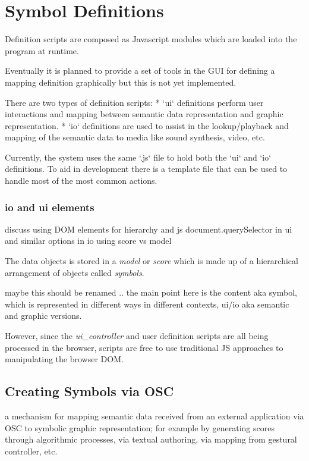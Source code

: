 \documentclass{article}
\begin{document}
\section{Symbol Definitions}\label{library_definitions_api}

Definition scripts are composed as Javascript modules which are loaded into the program at runtime.

Eventually it is planned to provide a set of tools in the GUI for defining a mapping definition graphically but this is not yet implemented.

There are two types of definition scripts:
* `ui` definitions perform user interactions and mapping between semantic data representation and graphic representation.
* `io` definitions are used to assist in the lookup/playback and mapping of the semantic data to media like sound synthesis, video, etc.

Currently, the system uses the same `.js` file to hold both the `ui` and `io` definitions. To aid in development there is a template file that can be used to handle most of the most common actions.


\subsubsection*{io and ui elements}\label{subsec:io_ui_elements}

discuss using DOM elements for hierarchy and js document.querySelector in ui
and similar options in io using score vs model


The data objects is stored in a \textit{model} or \textit{score} which is made up of a hierarchical arrangement of objects called \textit{symbols}.


maybe this should be renamed ..
the main point here is the content aka symbol, which is represented in different ways in different contexts, ui/io aka semantic and graphic versions.

However, since the \textit{ui\_controller} and user definition scripts are all being processed in the browser, scripts are free to use traditional JS approaches to manipulating the browser DOM.

\subsection{Creating Symbols via OSC}

a mechanism for mapping semantic data received from an external application via OSC to symbolic graphic representation; for example by generating scores through algorithmic processes, via textual authoring, via mapping from gestural controller, etc.
\end{document}
